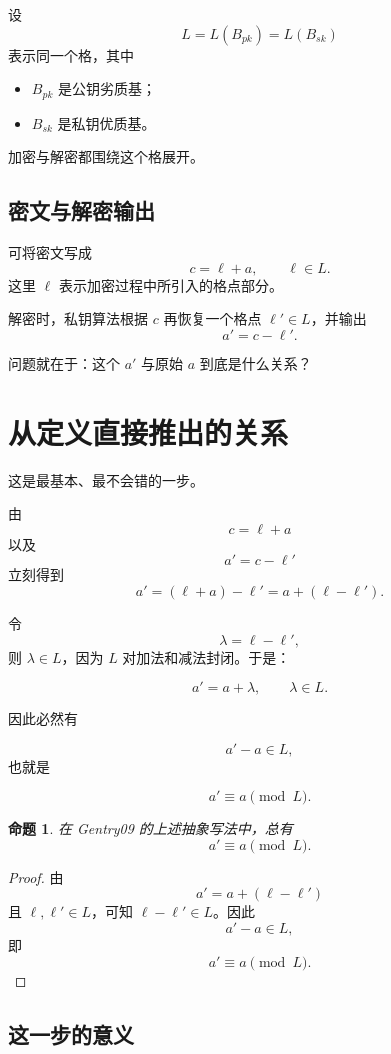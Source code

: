 \documentclass[12pt,a4paper]{article}
\newtheorem{proposition}{命题}
\begin{document}
设
\[
L = L(B_{pk}) = L(B_{sk})
\]
表示同一个格，其中

\begin{itemize}[leftmargin=2em]
    \item \(B_{pk}\) 是公钥劣质基；
    \item \(B_{sk}\) 是私钥优质基。
\end{itemize}

加密与解密都围绕这个格展开。

\subsection{密文与解密输出}

可将密文写成
\[
c = \ell + a,
\qquad \ell\in L.
\]
这里 \(\ell\) 表示加密过程中所引入的格点部分。

解密时，私钥算法根据 \(c\) 再恢复一个格点 \(\ell'\in L\)，并输出
\[
a' = c - \ell'.
\]

问题就在于：这个 \(a'\) 与原始 \(a\) 到底是什么关系？

\section{从定义直接推出的关系}

这是最基本、最不会错的一步。

由
\[
c=\ell+a
\]
以及
\[
a' = c-\ell'
\]
立刻得到
\[
a' = (\ell+a)-\ell' = a + (\ell-\ell').
\]

令
\[
\lambda = \ell-\ell',
\]
则 \(\lambda\in L\)，因为 \(L\) 对加法和减法封闭。于是：

\[
a' = a + \lambda,
\qquad \lambda\in L.
\]

因此必然有

\[
a' - a \in L,
\]
也就是

\[
a' \equiv a \pmod L.
\]

\begin{proposition}
在 Gentry09 的上述抽象写法中，总有
\[
a' \equiv a \pmod L.
\]
\end{proposition}

\begin{proof}
由
\[
a' = a + (\ell-\ell')
\]
且 \(\ell,\ell'\in L\)，可知 \(\ell-\ell'\in L\)。因此
\[
a'-a \in L,
\]
即
\[
a' \equiv a \pmod L.
\]
\end{proof}

\subsection{这一步的意义}
\end{document}
